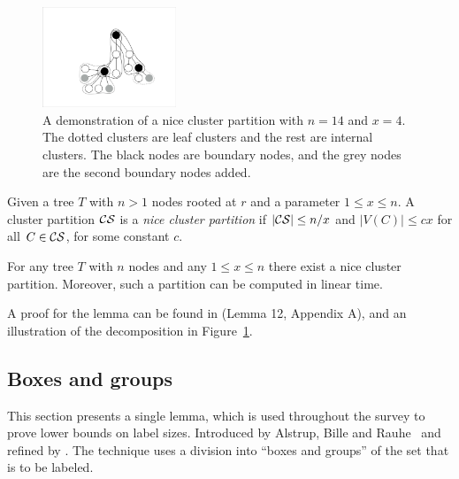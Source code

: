 				\begin{figure}[!ht]
				\centering
				\includegraphics[width=40mm]{./Figures/newclustering.pdf}
				\caption{A demonstration of a nice cluster partition with $n=14$ and $x=4$. The dotted clusters are leaf clusters and the rest are internal clusters. The black nodes are boundary nodes, and the grey nodes  are the second boundary nodes added.}
				\label{fig:niceClusterDemo}
			\end{figure}
			
\begin{definition}\label{dfn:nice-cluster-partition}
Given a tree $T$ with $n>1$ nodes rooted at $r$ and a parameter $ 1 \leq x \leq n$. A cluster partition $ \mathcal{CS}$ is a \emph{nice cluster partition}  if   $\vert  \mathcal{CS} \vert \leq n/x$  and  $\vert V(C) \vert \leq cx$ for all $C \in  \mathcal{CS}$, for some constant $c$. 
\end{definition}


\begin{lemma}\label{lemma:decomposition}
For any tree $T$ with $n$ nodes and any  $1 \leq x \leq n$ there exist a nice cluster partition. Moreover, such a partition can be computed in linear time.
\end{lemma}
A proof for the lemma can be found in \cite{alstrup1997finding} (Lemma 12, Appendix A), and an illustration of the decomposition in Figure~\ref{fig:niceClusterDemo}.

\subsection{Boxes and groups}\label{section:boxes-and-groups}

This section presents a single lemma, which is used throughout the survey to prove lower bounds on label sizes. Introduced by Alstrup, Bille and Rauhe~ and refined  by . The technique uses a division  into ``boxes and groups'' of the set that is to be labeled.  

